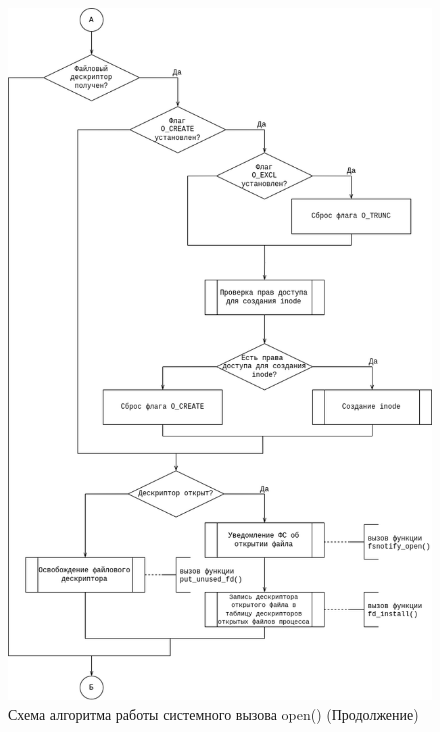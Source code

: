 \begin{figure}[H]
	\centering
	\includegraphics[scale=0.6]{assets/flowchart-open1.drawio.png}
	\caption{Схема алгоритма работы системного вызова open() (Продолжение)}
\end{figure}

